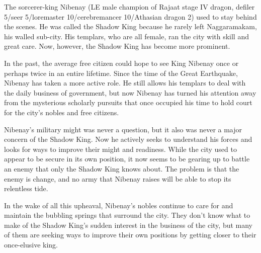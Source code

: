 {
	The sorcerer-king Nibenay (LE male champion of Rajaat stage IV dragon, defiler 5/seer 5/loremaster 10/cerebremancer 10/Athasian dragon 2) used to stay behind the scenes. He was called the Shadow King because he rarely left Naggaramakam, his walled sub-city. His templars, who are all female, ran the city with skill and great care. Now, however, the Shadow King has become more prominent.

	In the past, the average free citizen could hope to see King Nibenay once or perhaps twice in an entire lifetime. Since the time of the Great Earthquake, Nibenay has taken a more active role. He still allows his templars to deal with the daily business of government, but now Nibenay has turned his attention away from the mysterious scholarly pursuits that once occupied his time to hold court for the city's nobles and free citizens.

	Nibenay's military might was never a question, but it also was never a major concern of the Shadow King. Now he actively seeks to understand his forces and looks for ways to improve their might and readiness. While the city used to appear to be secure in its own position, it now seems to be gearing up to battle an enemy that only the Shadow King knows about. The problem is that the enemy is change, and no army that Nibenay raises will be able to stop its relentless tide.

	In the wake of all this upheaval, Nibenay's nobles continue to care for and maintain the bubbling springs that surround the city. They don't know what to make of the Shadow King's sudden interest in the business of the city, but many of them are seeking ways to improve their own positions by getting closer to their once-elusive king.
}
